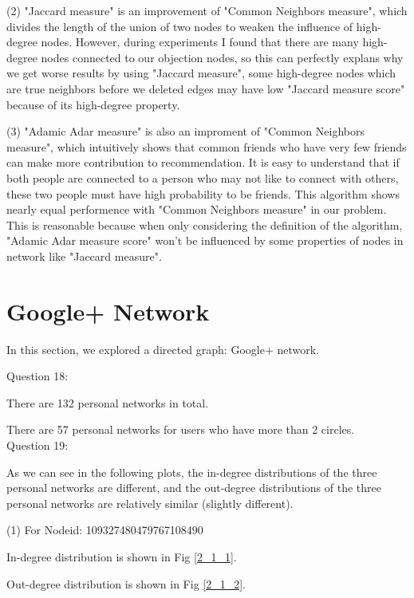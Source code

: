 \documentclass[11pt]{article}
\begin{document}
(2) "Jaccard measure" is an improvement of "Common Neighbors measure", which divides the length of the union of two nodes to weaken the influence of high-degree nodes. However, during experiments I found that there are many high-degree nodes connected to our objection nodes, so this can perfectly explans why we get worse results by using "Jaccard measure", some high-degree nodes which are true neighbors before we deleted edges may have low "Jaccard measure score" because of its high-degree property.

(3) "Adamic Adar measure" is also an improment of "Common Neighbors measure", which intuitively shows that common friends who have very few friends can make more contribution to recommendation. It is easy to understand that if both people are connected to a person who may not like to connect with others, these two people must have high probability to be friends. This algorithm shows nearly equal performence with "Common Neighbors measure" in our problem. This is reasonable because when only considering the definition of the algorithm, "Adamic Adar measure score"
won't be influenced by some properties of nodes in network like "Jaccard measure".


\section{Google+ Network}

In this section, we explored a directed graph: Google+ network.

Question 18:

There are 132 personal networks in total.

There are 57 personal networks for users who have more than 2 circles.\\

Question 19:

As we can see in the following plots, the in-degree distributions of the three personal networks are different, and the out-degree distributions of the three personal networks are relatively similar (slightly different).

(1) For Nodeid: 109327480479767108490

In-degree distribution is shown in Fig \ref{2_1_1}.

Out-degree distribution is shown in Fig \ref{2_1_2}.
\end{document}
